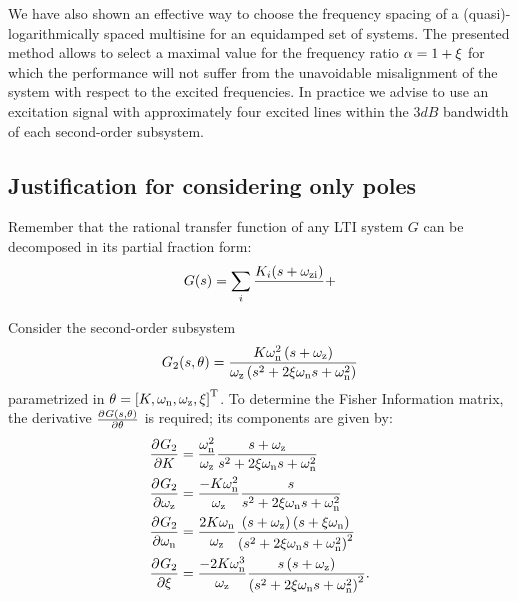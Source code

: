 We have also shown an effective way to choose the frequency spacing of a (quasi)-logarithmically spaced multisine for an equidamped set of systems.
The presented method allows to select a maximal value for the frequency ratio $\alpha = 1 + \damping$ for which the performance will not suffer from the unavoidable misalignment of the system with respect to the excited frequencies.
In practice we advise to use an excitation signal with approximately four excited lines within the $3\unit{dB}$ bandwidth of each second-order subsystem.

\begin{subappendices}
  \section{Justification for considering only poles}

Remember that the rational transfer function of any \gls{LTI} system $G$ can be decomposed in its partial fraction form:
\begin{equation}
  G(s) = \sum_i \frac{K_i (s+\wz[i])}{} +  
\end{equation}

Consider the second-order subsystem
\begin{equation}
  G_2(s, \theta) = \frac{K \wn^2 \left( s + \wz \right)}{\wz \left(s^2 + 2 \damping \wn s + \wn^2 \right)}
\end{equation}
parametrized in $\theta =  \left[K, \wn, \wz, \damping \right]^{\T}$.
To determine the Fisher Information matrix, the derivative $\PartialDerivative{G(s,\theta)}{\theta}$ is required; its components are given by:
\begin{align}
  \PartialDerivative{G_2}{K} 
    &= 
  \frac{\wn^2}{\wz}
  \frac{s + \wz}{s^2 + 2 \damping \wn s + \wn^2 }
  \\
  \PartialDerivative{G_2}{\wz} 
    &= 
    \frac{-K \wn^2}
              {\wz} 
    \frac{s}
              {s^2 + 2 \damping \wn s + \wn^2} 
  \\
  \PartialDerivative{G_2}{\wn} 
  &= 
  \frac{2 K \wn}
            {\wz} 
  \frac{\left( s + \wz \right) \left( s+ \damping \wn \right)}
            {\left( s^2 + 2 \damping \wn s + \wn^2 \right)^2}
  \\
  \PartialDerivative{G_2}{\damping}
  &= 
  \frac{-2 K \wn^3}
            {\wz}
  \frac{s \left( s + \wz \right)}
             {\left( s^2 + 2 \damping \wn s + \wn^2 \right)^2}
  \text{.}
\end{align}


\end{subappendices}
